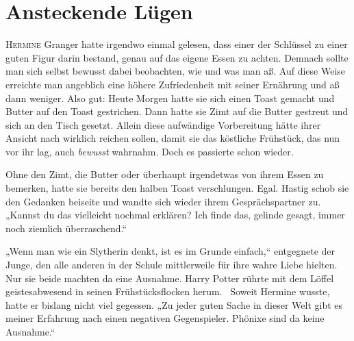\chapter{Ansteckende Lügen}

\lettrine{H}{ermine} Granger hatte irgendwo einmal gelesen, dass einer der Schlüssel zu einer guten Figur darin bestand, genau auf das eigene Essen zu achten. Demnach sollte man sich selbst bewusst dabei beobachten, wie und was man aß. Auf diese Weise erreichte man angeblich eine höhere Zufriedenheit mit seiner Ernährung und aß dann weniger.
Also gut: Heute Morgen hatte sie sich einen Toast gemacht und Butter auf den Toast gestrichen. Dann hatte sie Zimt auf die Butter gestreut und sich an den Tisch gesetzt. Allein diese aufwändige Vorbereitung hätte ihrer Ansicht nach wirklich reichen sollen, damit sie das köstliche Frühstück, das nun vor ihr lag, auch \emph{bewusst} wahrnahm. Doch es passierte schon wieder.

Ohne den Zimt, die Butter oder überhaupt irgendetwas von ihrem Essen zu bemerken, hatte sie bereits den halben Toast verschlungen. Egal. Hastig schob sie den Gedanken beiseite und wandte sich wieder ihrem Gesprächspartner zu. „Kannst du das vielleicht nochmal erklären? Ich finde das, gelinde gesagt, immer noch ziemlich überraschend.“

„Wenn man wie ein Slytherin denkt, ist es im Grunde einfach,“ entgegnete der Junge, den alle anderen in der Schule mittlerweile für ihre wahre Liebe hielten. Nur sie beide machten da eine Ausnahme. Harry Potter rührte mit dem Löffel geistesabwesend in seinen Frühstücksflocken herum. ~Soweit Hermine wusste, hatte er bislang nicht viel gegessen. „Zu jeder guten Sache in dieser Welt gibt es meiner Erfahrung nach einen negativen Gegenspieler. Phönixe sind da keine Ausnahme.“

